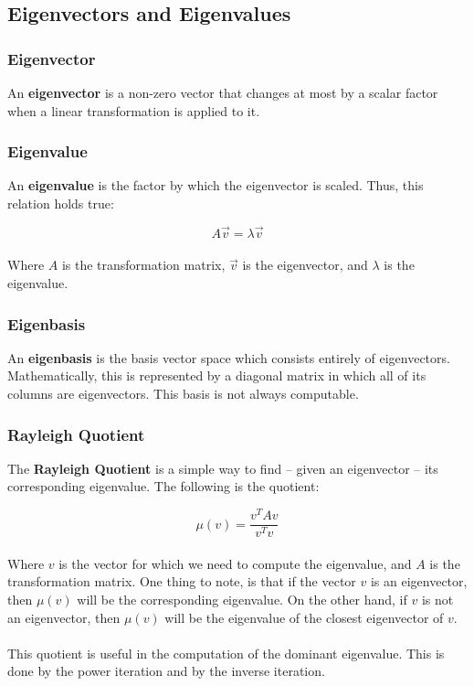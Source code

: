 \documentclass{article}
\begin{document}
\subsection{Eigenvectors and Eigenvalues}
\subsubsection{Eigenvector}
An \textbf{eigenvector} is a non-zero vector that changes at most by a scalar factor when a linear transformation is applied to it. 

\subsubsection{Eigenvalue}
An \textbf{eigenvalue} is the factor by which the eigenvector is scaled. Thus, this relation holds true:

\[ A\overrightarrow{v} = \lambda\overrightarrow{v} \] \\
Where $A$ is the transformation matrix, $\overrightarrow{v}$ is the eigenvector, and $\lambda$ is the eigenvalue.

\subsubsection{Eigenbasis}
An \textbf{eigenbasis} is the basis vector space which consists entirely of eigenvectors. Mathematically, this is represented by a diagonal matrix in which all of its columns are eigenvectors. This basis is not always computable.

\subsubsection{Rayleigh Quotient}
The \textbf{Rayleigh Quotient} is a simple way to find -- given an eigenvector -- its corresponding eigenvalue. The following is the quotient:

\[ \mu(v) = \frac{v^T A v}{v^T v} \] \\
Where $v$ is the vector for which we need to compute the eigenvalue, and $A$ is the transformation matrix. One thing to note, is that if the vector $v$ is an eigenvector, then $\mu(v)$ will be the corresponding eigenvalue. On the other hand, if $v$ is not an eigenvector, then $\mu(v)$ will be the eigenvalue of the closest eigenvector of $v$. \\ \\
This quotient is useful in the computation of the dominant eigenvalue. This is done by the power iteration and by the inverse iteration.
\end{document}
